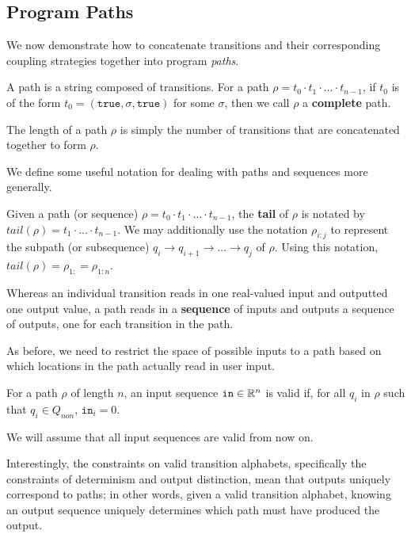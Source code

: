 
\subsection{Program Paths}

We now demonstrate how to concatenate transitions and their corresponding coupling strategies together into program \textit{paths}.

\begin{defn}[Paths]
    A path is a string composed of transitions. For a path $\rho = t_0\cdot t_1\cdot\ldots\cdot t_{n-1}$, if $t_0$ is of the form $t_0 = (\texttt{true}, \sigma, \texttt{true})$ for some $\sigma$, then we call $\rho$ a \textbf{complete} path.
\end{defn}

The length of a path $\rho$ is simply the number of transitions that are concatenated together to form $\rho$. 

We define some useful notation for dealing with paths and sequences more generally. 

Given a path (or sequence) $\rho = t_0\cdot t_1\cdot \ldots\cdot t_{n-1}$, the \textbf{tail} of $\rho$ is notated by $tail(\rho) = t_1\cdot \ldots\cdot t_{n-1}$. 
We may additionally use the notation $\rho_{i:j}$ to represent the subpath (or subsequence) $q_i\to q_{i+1}\to \ldots \to q_j$ of $\rho$. Using this notation, $tail(\rho) = \rho_{1:} = \rho_{1:n}$.

Whereas an individual transition reads in one real-valued input and outputted one output value, a path reads in a \textbf{sequence} of inputs and outputs a sequence of outputs, one for each transition in the path.

As before, we need to restrict the space of possible inputs to a path based on which locations in the path actually read in user input.
\begin{defn}
    For a path $\rho$ of length $n$, an input sequence $\texttt{in}\in \mathbb{R}^n$ is valid if, for all $q_i$ in $\rho$ such that $q_i \in Q_{non}$, $\texttt{in}_i = 0$.  
\end{defn} 

We will assume that all input sequences are valid from now on. 


Interestingly, the constraints on valid transition alphabets, specifically the constraints of determinism and output distinction, mean that outputs uniquely correspond to paths; in other words, given a valid transition alphabet, knowing an output sequence uniquely determines which path must have produced the output. 

